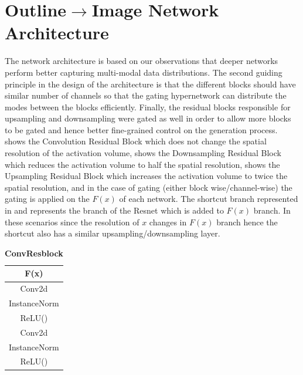 \section{Outline$\rightarrow$Image Network Architecture}
The network architecture is based on our observations that deeper networks perform better capturing multi-modal data distributions. The second guiding principle in the design of the architecture is that the different blocks should have similar number of channels so that the gating hypernetwork can distribute the modes between the blocks efficiently. Finally, the residual blocks responsible for upsampling and downsampling were gated as well in order to allow more blocks to be gated and hence better fine-grained control on the generation process. 
 shows the Convolution Residual Block which does not change the spatial resolution of the activation volume, 
 shows the Downsampling Residual Block which reduces the activation volume to half the spatial resolution, 
 shows the Upsampling Residual Block which increases the activation volume to twice the spatial resolution,  and in the case of gating (either block wise/channel-wise) the gating is applied on the $F(x)$ of each network. 
The shortcut branch represented in  and  represents the branch of the Resnet which is added to $F(x)$ branch. In these scenarios since the resolution of $x$ changes in $F(x)$ branch hence the shortcut also has a similar upsampling/downsampling layer.


\begin{table}[ht]
    \makegapedcells
        \centering %
        \begin{tabular}{c} %
        \toprule
        \textbf{F(x)}\\%
        \midrule
        Conv2d \\
        InstanceNorm\\ %
        ReLU() \\
        Conv2d \\
        InstanceNorm\\ %
        ReLU() \\
        \bottomrule %
        \end{tabular}
        \caption{\textbf{ConvResblock}} %
        \label{table:convresblock} %
\end{table}

